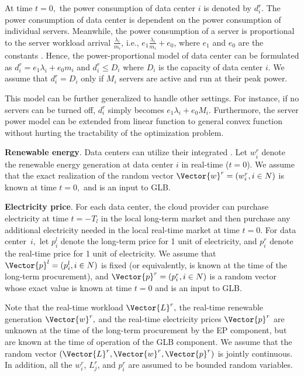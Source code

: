 At time $t = 0,$ the power consumption of data center $i$ is denoted
by $d^r_i$. The power consumption of data center is dependent on the power consumption of individual servers. Meanwhile, the power consumption of a server is proportional to the server workload arrival $\frac{\lambda_i}{m_i}$, i.e., $e_1 \frac{\lambda_i}{m_i}+ e_0$, where $e_1$ and $e_0$ are the constants \cite{spec,lin2013dynamic}. Hence, the power-proportional model of data center can be formulated as 
$d^r_i=e_1 \lambda_i+ e_0 m_i$ and $d^r_i\leq D_i$ where $D_i$ is the capacity of data center $i$. We assume that $d^r_i=D_i$ only if $M_i$ servers are active and run at their peak power. 

This model can be further generalized to handle other settings. For instance, if no servers can be turned off, $d^r_i$ simply becomes $e_1 \lambda_i+ e_0 M_i$. Furthermore, the server power model can be extended from linear function to general convex function without hurting the tractability of the optimization problem. 
 

\textbf{Renewable energy}. Data centers can utilize their integrated . Let $w^r_i$ denote the renewable energy generation at data center $i$ in real-time ($t=0$). We assume that the exact realization of the random vector $\Vector{w}^r = (w^r_i,i \in N)$ is known at time $t = 0,$ and is an input to GLB. 


\textbf{Electricity price}. For each data center, the cloud provider can purchase electricity at time $t=-T_l$ in the local long-term market and then purchase any additional electricity needed in the local real-time market at time $t = 0.$ For data center~$i,$ let $p^{l}_i$ denote the long-term price for 1 unit of electricity, and $p^{r}_i$ denote the real-time price for 1 unit of electricity. We assume that $\Vector{p}^l = (p^l_i,i \in N)$ is fixed (or equivalently, is known at the time of the long-term procurement), and $\Vector{p}^r= (p^r_i, i \in N)$ is a random vector whose exact value is known at time $t = 0$ and is an input to GLB.

Note that the real-time workload $\Vector{L}^r,$ the real-time
renewable generation $\Vector{w}^r,$ and the real-time electricity
prices $\Vector{p}^r$ are unknown at the time of the long-term
procurement by the EP component, but are known at the time of
operation of the GLB component. We assume that the random vector
$(\Vector{L}^r,\Vector{w}^r,\Vector{p}^r)$ is jointly continuous. In
addition, all the $w^r_i$, $L^r_j$, and $p^r_i$ are assumed to be
bounded random variables.

